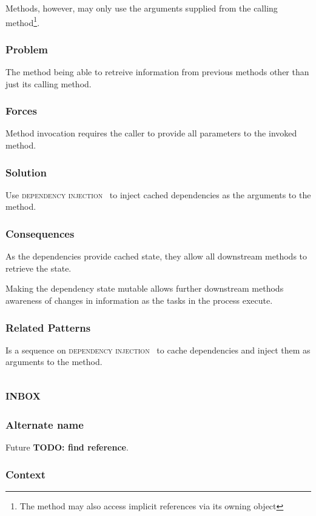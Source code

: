 \documentclass[prodmode]{style/acmlarge}
\begin{document}
Methods, however, may only use the arguments supplied from the calling
method\footnote{The method may also access implicit references via its
owning object}.

\subsubsection*{Problem} The method being able to retreive information from
previous methods other than just its calling method.

\subsubsection*{Forces} Method invocation requires the caller to provide all
parameters to the invoked method.

\subsubsection*{Solution} Use \textsc{dependency injection}~\cite{ioc} to inject
cached dependencies as the arguments to the method.

\subsubsection*{Consequences} As the dependencies provide cached state, they
allow all downstream methods to retrieve the state.

Making the dependency state mutable allows further downstream methods awareness
of changes in information as the tasks in the process execute.

\subsubsection*{Related Patterns} Is a sequence on \textsc{dependency
injection}~\cite{ioc} to cache dependencies and inject them as arguments to the
method.



\subsection{\textsc{\textbf{inbox}}}

\subsubsection*{Alternate name} Future \textbf{TODO: find reference}.

\subsubsection*{Context}
\end{document}
